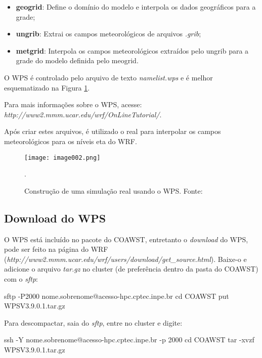 \begin{itemize}
\item \textbf{geogrid}: Define o domínio do modelo e interpola os dados geográficos para a grade;
\item \textbf{ungrib}: Extrai os campos meteorológicos de arquivos \textit{.grib};
\item \textbf{metgrid}: Interpola os campos meteorológicos extraídos pelo ungrib para a grade do modelo definida pelo meogrid.
\end{itemize}
\bigskip

\noindent O WPS é controlado pelo arquivo de texto \textit{namelist.wps} e é melhor esquematizado na Figura \textcolor{bleu_cite}{\ref{wpsdetalha}}.
\bigskip

\noindent Para mais informações sobre o WPS, acesse: \textcolor{bleu_cite}{\textit{http://www2.mmm.ucar.edu/wrf/OnLineTutorial/}}.
\bigskip

\noindent Após criar estes arquivos, é utilizado o real para interpolar os campos meteorológicos para os níveis eta do WRF.
\bigskip

\begin{figure}[H]
    \centering
    \captionsetup{justification=centering}
    \texttt{[image: image002.png]}
    \caption{Construção de uma simulação real usando o WPS. \newline Fonte: \textcite{duda2006}}.
    \label{wpsdetalha}
\end{figure}
\bigskip

\subsection{Download do WPS}
\bigskip

\noindent O WPS está incluído no pacote do COAWST, entretanto o \textit{download} do WPS, pode ser feito na página do WRF (\textcolor{bleu_cite}{\textit{http://www2.mmm.ucar.edu/wrf/users/download/get\_source.html}}). Baixe-o e adicione o arquivo \textit{tar.gz} no cluster (de preferência dentro da pasta do COAWST) com o \textit{sftp}:
\bigskip

\begin{bashcode}
sftp -P2000 nome.sobrenome@acesso-hpc.cptec.inpe.br
cd COAWST
put WPSV3.9.0.1.tar.gz
\end{bashcode}
\bigskip

\noindent Para descompactar, saia do \textit{sftp}, entre no cluster e digite:
\bigskip

\begin{bashcode}
ssh -Y nome.sobrenome@acesso-hpc.cptec.inpe.br -p 2000
cd COAWST
tar -xvzf WPSV3.9.0.1.tar.gz
\end{bashcode}
\bigskip

